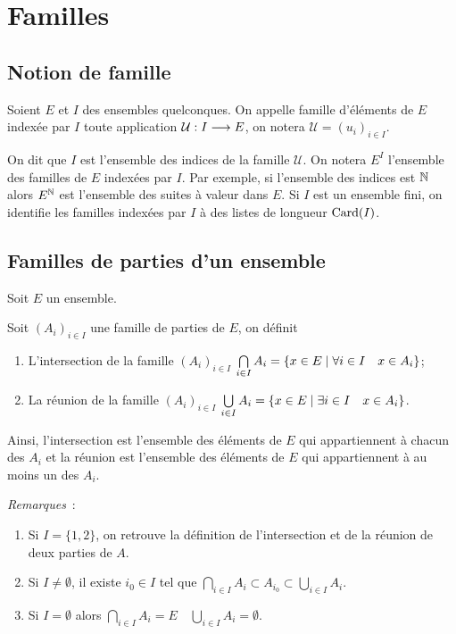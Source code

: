 \section{Familles}
\label{chap3-sec:familles}

\subsection{Notion de famille}
\label{chap3-subsec:notionfamille}
\begin{defdef}
  Soient \(E\) et \(I\) des ensembles quelconques. On appelle famille 
  d'éléments de \(E\) indexée par \(I\) toute application 
  \(\mathcal{U}:I \longrightarrow E\), on notera \(\mathcal{U} = (u_i)_{i \in 
  I}\).
\end{defdef}

On dit que \(I\) est l'ensemble des indices de la famille \(\mathcal{U}\). On 
notera \(E^I\) l'ensemble des familles de \(E\) indexées par \(I\). Par exemple, 
si l'ensemble des indices est \(\mathbb{N}\) alors \(E^{\mathbb{N}}\) est l'ensemble des suites 
à valeur dans \(E\). Si \(I\) est un ensemble fini, on identifie les familles 
indexées par \(I\) à des listes de longueur \(\operatorname{Card}(I)\).

\subsection{Familles de parties d'un ensemble}
\label{chap3-subsec:familledeparties}

Soit \(E\) un ensemble.
\begin{defdef}
  Soit \((A_i)_{i \in I}\) une famille de parties de \(E\), on définit
  \begin{enumerate}
    \item L'intersection de la famille \((A_i)_{i \in I}\)  
      \(\bigcap\limits_{i \in I} A_i = \left\{x \in E\mathrel{}\middle|\mathrel{}\forall i \in I 
      \quad x \in A_i\right\}\);
    \item La réunion de la famille \((A_i)_{i \in I}\)  \(\bigcup\limits_{i 
      \in I} A_i = \left\{x \in E\mathrel{}\middle|\mathrel{}\exists i \in I \quad x \in A_i\right\}\).
  \end{enumerate}
\end{defdef}

Ainsi, l'intersection est l'ensemble des éléments de \(E\) qui appartiennent à 
chacun des \(A_i\) et la réunion est l'ensemble des éléments de \(E\) qui 
appartiennent à au moins un des \(A_i\).

\emph{Remarques}~:
\begin{enumerate}
  \item Si \(I = \{1,2\}\), on retrouve la définition de l'intersection et de la 
    réunion de deux parties de \(A\).
  \item Si \(I \neq \emptyset\), il existe \(i_0 \in I\) tel que 
    \(\bigcap\limits_{i \in I} A_i \subset A_{i_0} \subset \bigcup\limits_{i 
    \in I} A_i\).
  \item Si \(I = \emptyset\) alors \(\bigcap\limits_{i \in I} A_i  = E \quad 
    \bigcup\limits_{i \in I} A_i = \emptyset\).
\end{enumerate}

